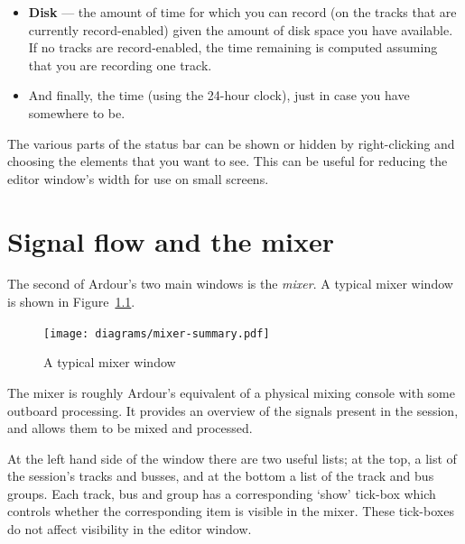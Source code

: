 \documentclass[10pt,a4paper]{book}
\begin{document}
{\begin{itemize}
\begin{ddanger}
Note that DSP load will probably not vary predictably with CPU speed.
Many other things are involved in the timing of the sound-card / JACK
/ Ardour interaction; including the real-time performance of your
system and kernel, the details of your hardware, and in some cases
blind (good or bad) luck.
\end{ddanger}

\item \textbf{Disk} --- the amount of time for which you can record (on the
  tracks that are currently record-enabled) given the amount of disk
  space you have available.  If no tracks are record-enabled, the time
  remaining is computed assuming that you are recording one track.
\item And finally, the time (using the 24-hour clock), just in case
  you have somewhere to be.
\end{itemize}

The various parts of the status bar can be shown or hidden by
right-clicking and choosing the elements that you want to see.  This
can be useful for reducing the editor window's width for use on small
screens.



\chapter{Signal flow and the mixer}


The second of Ardour's two main windows is the \emph{mixer}.  A
typical mixer window is shown in Figure~\ref{fig:mixer-summary}.

\begin{figure}[ht]
\begin{center}
\texttt{[image: diagrams/mixer-summary.pdf]}
\end{center}
\caption{A typical mixer window}
\label{fig:mixer-summary}
\end{figure}

The mixer is roughly Ardour's equivalent of a physical mixing console
with some outboard processing.  It provides an overview of the signals
present in the session, and allows them to be mixed and processed.

At the left hand side of the window there are two useful lists; at the
top, a list of the session's tracks and busses, and at the bottom a
list of the track and bus groups.  Each track, bus and group has a
corresponding `show' tick-box which controls whether the corresponding
item is visible in the mixer.  These tick-boxes do not affect
visibility in the editor window.

}
\end{document}
